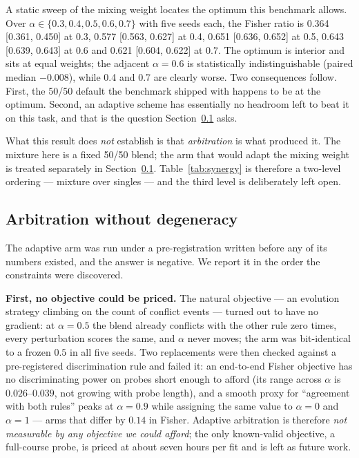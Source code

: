 \documentclass[11pt]{article}
\begin{document}
A static sweep of the mixing weight locates the optimum this benchmark allows. Over
$\alpha \in \{0.3, 0.4, 0.5, 0.6, 0.7\}$ with five seeds each, the Fisher ratio is 0.364
[0.361, 0.450] at 0.3, 0.577 [0.563, 0.627] at 0.4, 0.651 [0.636, 0.652] at 0.5, 0.643
[0.639, 0.643] at 0.6 and 0.621 [0.604, 0.622] at 0.7. The optimum is interior and sits at
equal weights; the adjacent $\alpha = 0.6$ is statistically indistinguishable (paired median
$-0.008$), while 0.4 and 0.7 are clearly worse. Two consequences follow. First, the 50/50
default the benchmark shipped with happens to be at the optimum. Second, an adaptive scheme
has essentially no headroom left to beat it on this task, and that is the question
Section~\ref{sec:pending} asks.

What this result does \emph{not} establish is that \emph{arbitration} is what produced it. The
mixture here is a fixed 50/50 blend; the arm that would adapt the mixing weight is treated
separately in Section~\ref{sec:pending}. Table~\ref{tab:synergy} is therefore a two-level
ordering --- mixture over singles --- and the third level is deliberately left open.
\subsection{Arbitration without degeneracy}\label{sec:pending}

The adaptive arm was run under a pre-registration written before any of its numbers existed,
and the answer is negative. We report it in the order the constraints were discovered.

\textbf{First, no objective could be priced.} The natural objective --- an evolution strategy
climbing on the count of conflict events --- turned out to have no gradient: at $\alpha = 0.5$
the blend already conflicts with the other rule zero times, every perturbation scores the same,
and $\alpha$ never moves; the arm was bit-identical to a frozen $0.5$ in all five seeds. Two
replacements were then checked against a pre-registered discrimination rule and failed it: an
end-to-end Fisher objective has no discriminating power on probes short enough to afford (its
range across $\alpha$ is $0.026$--$0.039$, not growing with probe length), and a smooth proxy
for ``agreement with both rules'' peaks at $\alpha = 0.9$ while assigning the same value to
$\alpha = 0$ and $\alpha = 1$ --- arms that differ by $0.14$ in Fisher. Adaptive arbitration is
therefore \emph{not measurable by any objective we could afford}; the only known-valid objective,
a full-course probe, is priced at about seven hours per fit and is left as future work.
\end{document}
